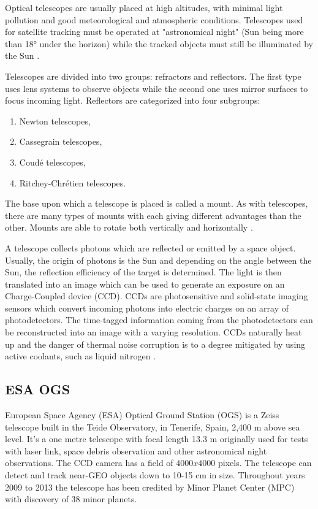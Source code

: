 Optical telescopes are usually placed at high altitudes, with minimal light pollution and good meteorological and atmospheric conditions. Telescopes used for satellite tracking must be operated at "astronomical night" (Sun being more than 18° under the horizon) while the tracked objects must still be illuminated by the Sun \citep{klinkrad2006space}.

	Telescopes are divided into two groups: refractors and reflectors. The first type uses lens systems to observe objects while the second one uses mirror surfaces to focus incoming light. Reflectors are categorized into four subgroups:
	
\begin{enumerate}
	\item Newton telescopes,
	\item Cassegrain telescopes,
	\item Coudé telescopes,
	\item Ritchey-Chrétien telescopes.
\end{enumerate}
	
	The base upon which a telescope is placed is called a mount. As with telescopes, there are many types of mounts with each giving different advantages than the other. Mounts are able to rotate both vertically and horizontally \citep{klinkrad2006space}.
	
	A telescope collects photons which are reflected or emitted by a space object. Usually, the origin of photons is the Sun and depending on the angle between the Sun, the reflection efficiency of the target is determined. The light is then translated into an image which can be used to generate an exposure on an Charge-Coupled device (CCD). CCDs are photosensitive and solid-state imaging sensors which convert incoming photons into electric charges on an array of photodetectors. The time-tagged information coming from the photodetectors can be reconstructed into an image with a varying resolution. CCDs naturally heat up and the danger of thermal noise corruption is to a degree mitigated by using active coolants, such as liquid nitrogen \citep{klinkrad2006space}.

\subsection{ESA OGS}\label{subsec:esa_ogs}
European Space Agency (ESA) Optical Ground Station (OGS) is a Zeiss telescope built in the Teide Observatory, in Tenerife, Spain, 2,400 m above sea level. It's a one metre telescope with focal length 13.3 m originally used for tests with laser link, space debris observation and other astronomical night observations. The CCD camera has a field of $4000 x 4000$ pixels. The telescope can detect and track near-GEO objects down to 10-15 cm in size. Throughout years 2009 to 2013 the telescope has been credited by Minor Planet Center (MPC) with discovery of 38 minor planets.

